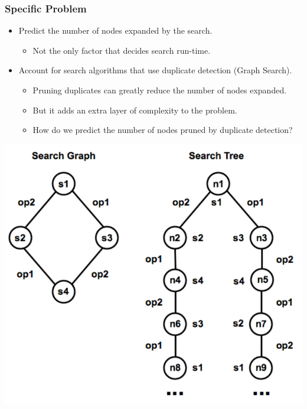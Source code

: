 \documentclass{beamer}
\begin{document}
\begin{frame}
  \frametitle{Specific Problem}
  \begin{itemize}
  \item Predict the number of nodes expanded by the search.
    \begin{itemize}
    \item Not the only factor that decides search run-time.
    \end{itemize}
  \item Account for search algorithms that use duplicate detection (Graph Search).
    \begin{itemize}
    \item Pruning duplicates can greatly reduce the number of nodes expanded.
    \item But it adds an extra layer of complexity to the problem.
    \item How do we predict the number of nodes pruned by duplicate detection?
    \end{itemize}
  \end{itemize}
  \centering
  \includegraphics[scale=0.25]{lelis_fig1.png} 
\end{frame}
\end{document}
